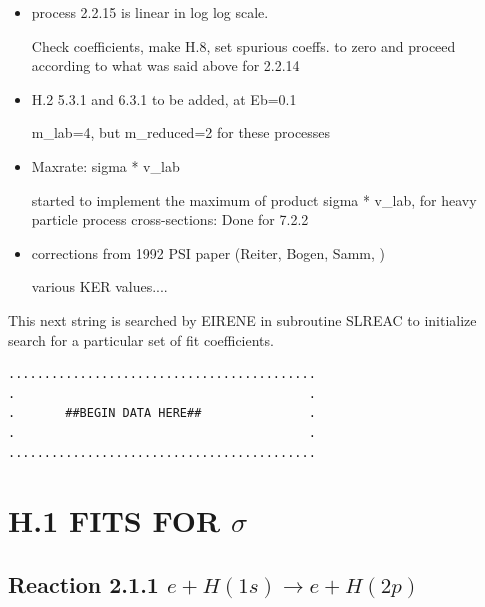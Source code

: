 \documentclass[12pt,dvipdfmx]{article}
\begin{document}
\begin{itemize}
\item{process 2.2.15 is linear in log log scale. }

Check coefficients, make H.8, set spurious coeffs. to zero and proceed according to what
was said above for 2.2.14
\item{H.2  5.3.1 and 6.3.1 to be added, at Eb=0.1}

m\_lab=4,  but m\_reduced=2 for these processes
\item {Maxrate: sigma * v\_lab }

started to implement the maximum of product sigma * v\_lab,
for heavy particle process cross-sections:
Done for 7.2.2
\item{corrections from 1992 PSI paper (Reiter, Bogen, Samm, \cite{kn:Reiter92})}

various KER values....

\end{itemize}
\newpage

This next string is searched by EIRENE in subroutine SLREAC
to initialize search for a particular set of fit coefficients.

\bigskip
\begin{small}\begin{verbatim}
...........................................
.                                         .
.       ##BEGIN DATA HERE##               .
.                                         .
...........................................
\end{verbatim}\end{small}
\newpage
\renewcommand{\theHsection}{arabicsection.\thesection}
\renewcommand\thesection{\arabic{section}}
\setcounter{section}{0}

\section{H.1  FITS FOR $\sigma$}

\subsection{
Reaction 2.1.1 $   e + H(1s) \rightarrow e + H(2p) $}
\end{document}
